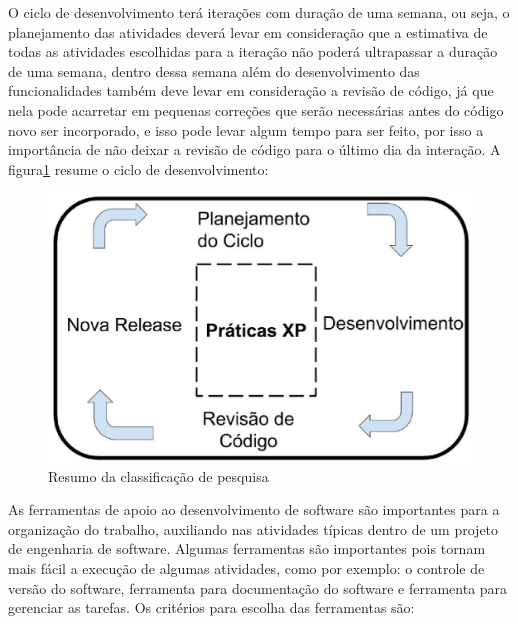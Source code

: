 O ciclo de desenvolvimento terá iterações com duração de uma semana, ou seja,
o planejamento das atividades deverá levar em consideração que a
estimativa de todas as atividades escolhidas para a iteração não poderá
ultrapassar a duração de uma semana, dentro dessa semana além do desenvolvimento
das funcionalidades também deve levar em consideração a revisão de código, já que
nela pode acarretar em pequenas correções que serão necessárias antes do código novo
ser incorporado, e isso pode levar algum tempo para ser feito, por isso a importância
de não deixar a revisão de código para o último dia da interação. A figura\ref{fig:def}
resume o ciclo de desenvolvimento:

\begin{figure}[h]
  \centering
  \includegraphics[width=1.0\textwidth]
      {figuras/desenvolvimento.eps}
  \caption{Resumo da classificação de pesquisa}
\label{fig:def}
\end{figure}

As ferramentas de apoio ao desenvolvimento de software são importantes para a
organização do trabalho, auxiliando nas atividades típicas dentro de um projeto
de engenharia de software. Algumas ferramentas são importantes pois tornam mais fácil
a execução de algumas atividades, como por exemplo: o controle de versão do software,
ferramenta para documentação do software e ferramenta para gerenciar as tarefas.
Os critérios para escolha das ferramentas são:


